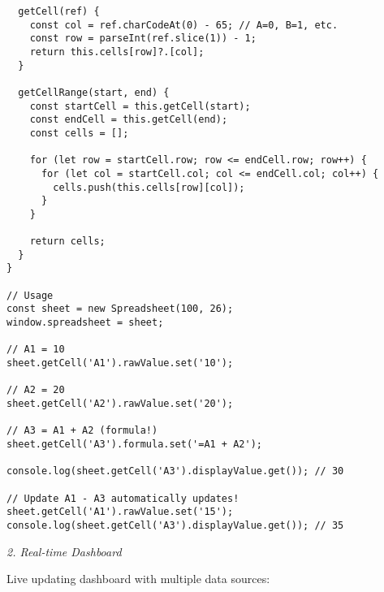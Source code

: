 \documentclass[11pt]{article}
\begin{document}
\begin{verbatim}
  getCell(ref) {
    const col = ref.charCodeAt(0) - 65; // A=0, B=1, etc.
    const row = parseInt(ref.slice(1)) - 1;
    return this.cells[row]?.[col];
  }
  
  getCellRange(start, end) {
    const startCell = this.getCell(start);
    const endCell = this.getCell(end);
    const cells = [];
    
    for (let row = startCell.row; row <= endCell.row; row++) {
      for (let col = startCell.col; col <= endCell.col; col++) {
        cells.push(this.cells[row][col]);
      }
    }
    
    return cells;
  }
}

// Usage
const sheet = new Spreadsheet(100, 26);
window.spreadsheet = sheet;

// A1 = 10
sheet.getCell('A1').rawValue.set('10');

// A2 = 20
sheet.getCell('A2').rawValue.set('20');

// A3 = A1 + A2 (formula!)
sheet.getCell('A3').formula.set('=A1 + A2');

console.log(sheet.getCell('A3').displayValue.get()); // 30

// Update A1 - A3 automatically updates!
sheet.getCell('A1').rawValue.set('15');
console.log(sheet.getCell('A3').displayValue.get()); // 35
\end{verbatim}

\emph{2. Real-time Dashboard}

Live updating dashboard with multiple data sources:
\end{document}

